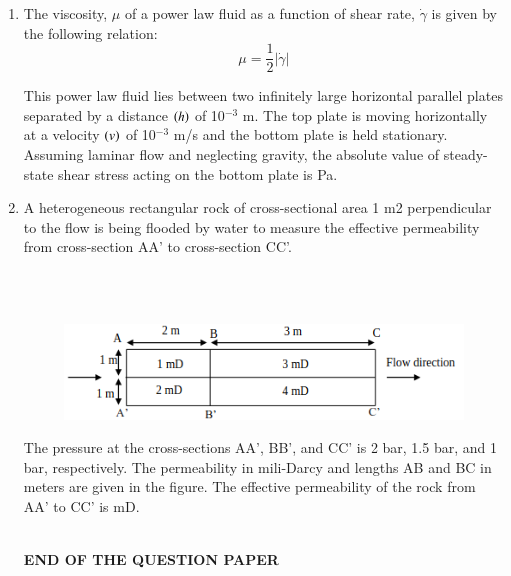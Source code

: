 \documentclass[journal,12pt,onecolumn]{IEEEtran}
\theoremstyle{remark}
\begin{document}
\begin{enumerate}
\hfill{}

\item The viscosity, $\mu$  of a power law fluid as a function of shear rate, $\dot{\gamma}$  is given by the following relation: 
\[ \mu = \frac{1}{2} |\dot{\gamma}| \]

This power law fluid lies between two infinitely large horizontal parallel plates separated by a distance $\left(h\right)$ of 10$^{-3}$ m. The top plate is moving horizontally at a velocity $\left(v\right)$ of 10$^{-3}$ m/s and the bottom plate is held stationary. Assuming laminar flow and neglecting gravity, the absolute value of steady-state shear stress acting on the bottom plate is \underline{\hspace{2cm}} Pa.  

\hfill{}

\item A heterogeneous rectangular rock of cross-sectional area 1 m2 perpendicular to the flow is
being flooded by water to measure the effective permeability from cross-section AA' to
cross-section CC'.

\hfill{}\\\\

\begin{figure}[h!]
  \centering
  \includegraphics[width=0.8\columnwidth]{figs/pic12.png} 
\end{figure}

The pressure at the cross-sections AA', BB', and CC' is 2 bar, 1.5 bar, and 1 bar,
respectively. The permeability in mili-Darcy and lengths AB and BC in meters are given in
the figure. The effective permeability of the rock from AA' to CC' is \underline{\hspace{4cm}}mD. 
\\\\



\begin{center}
	{\LARGE \textbf{END OF THE QUESTION PAPER}}
\end{center}

\end{enumerate}
\end{document}
